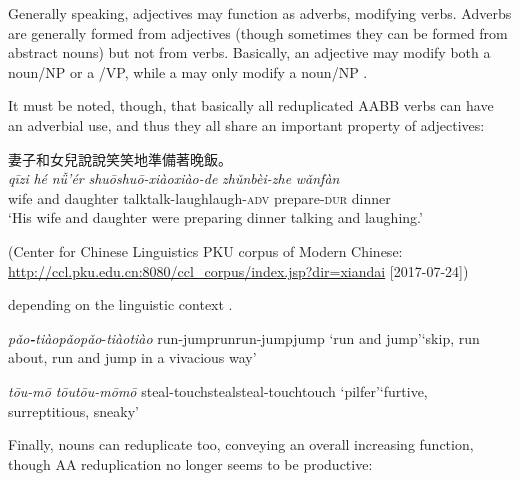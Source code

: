 \documentclass[output=paper]{langsci/langscibook}
\begin{document}
{  Generally speaking, adjectives may function as adverbs, modifying
  verbs. Adverbs are generally formed from adjectives (though sometimes
  they can be formed from abstract nouns) but not from verbs. Basically,
  an adjective may modify both a noun/NP or a /VP, while a  may
  only modify a noun/NP %
\citep[see][]{Arcodia2014}%
%
.

  It must be noted, though, that basically all reduplicated AABB verbs
  can have an adverbial use, and thus they all share an important
  property of adjectives:

\ea
  妻子和女兒說說笑笑地準備著晚飯。\\
  \gll \emph{qīzi} \emph{hé} \emph{nǚ'ér} \emph{shuō}\tld{}\emph{shuō-xiào}\tld{}\emph{xiào-de} \emph{zhǔnbèi-zhe} \emph{wǎnfàn}\\
  wife and daughter talk\tld{}talk-laugh\tld{}laugh-\textsc{adv}     prepare-\textsc{dur} dinner\\
  \glt `His wife and daughter were preparing dinner talking and laughing.'
\z

  (Center for Chinese Linguistics PKU corpus of Modern Chinese:
  \url{http://ccl.pku.edu.cn:8080/ccl_corpus/index.jsp?dir=xiandai}
  [2017-07-24])
} %
%
 depending on the linguistic context %
\citep[on the meaning of AABB verbal reduplication, see][]{Hu06}%
%
.

\ea\label{ex:BascianoMelloni:8}%
        {\emph{pǎo\textbf{-}tiào}}{\emph{pǎo}\tld{}\emph{pǎo}-\emph{tiào}\tld{}\emph{tiào}}%
        {run-jump}{run\tld{}run-jump\tld{}jump}%
        {`run and jump'}{`skip, run about, run and jump in a vivacious way'}

\ex\label{ex:BascianoMelloni:9}%
        {\emph{tōu-mō} }{\emph{tōu}\tld{}\emph{tōu-mō}\tld{}\emph{mō}}%
        {steal-touch}{steal\tld{}steal-touch\tld{}touch}%
        {`pilfer'}{`furtive, surreptitious, sneaky'}
\z

Finally, nouns can reduplicate too, conveying an overall increasing
function, though AA reduplication no longer seems to be productive:
\end{document}
